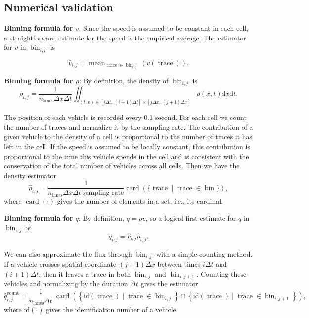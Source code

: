 \documentclass[a4paper, 10pt, conference]{ieeeconf}      %
\DeclareMathOperator{\card}{card}
\DeclareMathOperator{\trc}{trace}
\DeclareMathOperator{\mean}{mean}
\DeclareMathOperator{\bin}{bin}
\DeclareMathOperator{\lns}{lanes}
\DeclareMathOperator{\cnt}{count}
\begin{document}
\subsection{Numerical validation}

\textbf{Binning formula for $v$}: Since the speed is assumed to be constant in each cell, a straightforward estimate for the speed is the empirical average. The estimator for $v$ in $\bin_{i,j}$ is

\begin{equation}
\widehat{v}_{i,j}=\mean_{\trc \in \bin_{i,j}}(v(\trc)).
\end{equation}

\textbf{Binning formula for $\rho$}: By definition, the density of $\bin_{i,j}$ is  
\begin{equation}
\rho_{i,j}=\frac{1}{n_{\lns}\Delta x\Delta t}\iint_{\left(t,x\right)\in [i\Delta t, \,(i+1)\Delta t] \times [j\Delta x,\,(j+1)\Delta x]}\rho(x,t) \text{d}x \text{d}t.
\end{equation}

The position of each vehicle is recorded every 0.1 second. For each cell we count the number of traces and normalize it by the sampling rate. The contribution of a given vehicle to the density of a cell is proportional to the number of traces it has left in the cell. If the speed is assumed to be locally constant, this contribution is proportional to the time this vehicle spends in the cell and is consistent with the conservation of the total number of vehicles across all cells. Then we have the density estimator
\begin{equation}
\widehat{\rho}_{i,j}=\frac{1}{n_{\lns} \Delta x \Delta t \: \text{sampling rate}}\card ( \{ \trc \mid \trc \in \bin \} ),
\end{equation}
where $\card (\cdot)$ gives the number of elements in a set, i.e., its cardinal. 

\textbf{Binning formula for $q$}: By definition, $q=\rho v$, so a logical first estimate for $q$ in $\bin_{i,j}$ is 
\begin{equation}
\widehat{q}_{i,j}=\widehat{v}_{i,j}\widehat{\rho}_{i,j}.
\end{equation}

We can also approximate the flux through $\bin_{i,j}$ with a simple counting method. If a vehicle crosses spatial coordinate $\left(j+1\right)\Delta x$ between times $i\Delta t$ and $\left(i+1\right)\Delta t$, then it leaves a trace in both $\bin_{i,j}$ and $\bin_{i,j+1}$. Counting these vehicles and normalizing by the duration $\Delta t$ gives the estimator
\begin{equation}
\widehat{q}_{i,j}^{\cnt}=\frac{1}{n_{\lns}\Delta t}\: \card\left(\left\{ \text{id} \left(\trc\right)\mid \trc \in \bin_{i,j}\right\} \cap\left\{ \text{id}\left( \trc \right)\mid \trc\in \bin_{i,j+1}\right\} \right),
\end{equation}
where id$(\cdot)$ gives the identification number of a vehicle.
\end{document}
